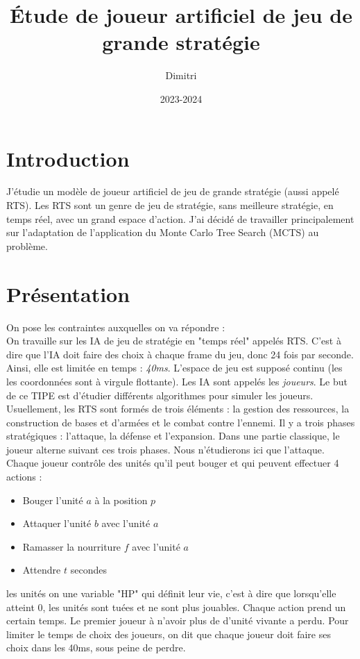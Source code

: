 \documentclass[a4paper, 11pt]{article}
\theoremstyle{definition}
\begin{document}
\title{Étude de joueur artificiel de jeu de grande stratégie}
\author{Dimitri }
\date{2023-2024}

\maketitle

\section*{Introduction}
J'étudie un modèle de joueur artificiel de jeu de grande stratégie (aussi appelé RTS).
Les RTS sont un genre de jeu de stratégie, sans meilleure stratégie, en temps réel, avec un grand espace d'action.
J'ai décidé de travailler principalement sur l'adaptation de l'application du Monte Carlo Tree Search (MCTS) au problème.


\section*{Présentation}
On pose les contraintes auxquelles on va répondre :\\
On travaille sur les IA de jeu de stratégie en "temps réel" appelés RTS. C'est à dire que
l'IA doit faire des choix à chaque frame du jeu, donc 24 fois par seconde. Ainsi,
elle est limitée en temps : \emph{40ms}. L'espace de jeu est supposé continu (les
les coordonnées sont à virgule flottante). Les IA sont appelés les \emph{joueurs}.
Le but de ce TIPE est d'étudier différents algorithmes pour simuler les joueurs.
Usuellement, les RTS sont formés de trois éléments : la gestion des ressources,
la construction de bases et d'armées et le combat contre l'ennemi. Il y a trois 
phases stratégiques : l'attaque, la défense et l'expansion. Dans une partie classique,
le joueur alterne suivant ces trois phases. Nous n'étudierons ici que l'attaque.
\\
Chaque joueur contrôle des unités qu'il peut bouger et qui peuvent effectuer 4
actions :
\begin{itemize}
    \item Bouger l'unité $a$ à la position $p$
    \item Attaquer l'unité $b$ avec l'unité $a$
    \item Ramasser la nourriture $f$ avec l'unité $a$
    \item Attendre $t$ secondes
\end{itemize}
les unités on une variable "HP" qui définit leur vie, c'est à dire que lorsqu'elle
atteint 0, les unités sont tuées et ne sont plus jouables. Chaque action prend
un certain temps.
Le premier joueur à n'avoir plus de d'unité vivante a perdu.
Pour limiter le temps de choix des joueurs, on dit que chaque joueur doit faire ses
choix dans les 40ms, sous peine de perdre.
\end{document}
